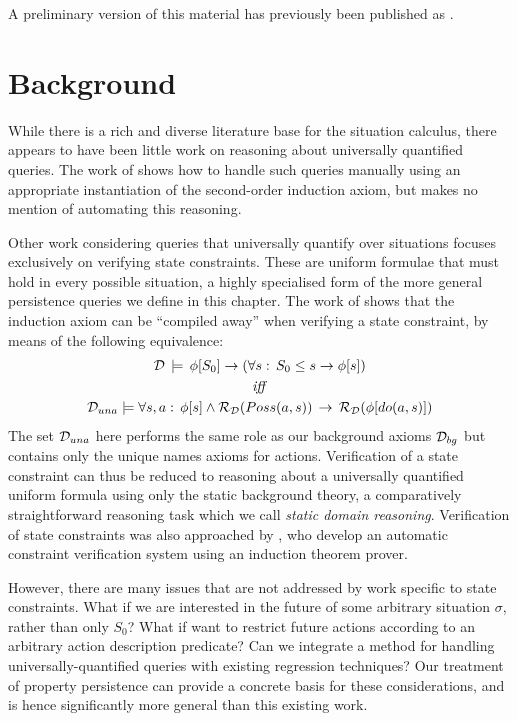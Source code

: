 A preliminary version of this material has previously been published
as \citep{kelly07sc_persistence}.


\section{Background\label{sec:Persistence:Background}}

While there is a rich and diverse literature base for the situation
calculus, there appears to have been little work on reasoning about
universally quantified queries. The work of \citet{Reiter93proving}
shows how to handle such queries manually using an appropriate instantiation
of the second-order induction axiom, but makes no mention of automating
this reasoning.

Other work considering queries that universally quantify over situations
focuses exclusively on verifying state constraints. These are uniform
formulae that must hold in every possible situation, a highly specialised
form of the more general persistence queries we define in this chapter.
The work of \citet{Lin94-StateConstraints} shows that the induction
axiom can be {}``compiled away'' when verifying a state constraint,
by means of the following equivalence:\begin{gather*}
\mathcal{D}\,\models\,\phi[S_{0}]\rightarrow\left(\forall s:\, S_{0}\leq s\rightarrow\phi[s]\right)\\
\mathit{iff}\\
\mathcal{D}_{una}\models\forall s,a:\,\phi[s]\wedge\mathcal{R}_{\mathcal{D}}(Poss(a,s))\,\rightarrow\,\mathcal{R}_{\mathcal{D}}(\phi[do(a,s)])\end{gather*}
 The set $\mathcal{D}_{una}$ here performs the same role as our background
axioms $\mathcal{D}_{bg}$ but contains only the unique names axioms for actions.
Verification of a state constraint can thus be reduced to reasoning
about a universally quantified uniform formula using only the static
background theory, a comparatively straightforward reasoning task
which we call \emph{static domain reasoning}. Verification of state
constraints was also approached by \citet{bertossi96automating},
who develop an automatic constraint verification system using an induction
theorem prover.

However, there are many issues that are not addressed by work specific
to state constraints. What if we are interested in the future of some
arbitrary situation $\sigma$, rather than only $S_{0}$? What if
want to restrict future actions according to an arbitrary action description
predicate? Can we integrate a method for handling universally-quantified
queries with existing regression techniques? Our treatment of property
persistence can provide a concrete basis for these considerations,
and is hence significantly more general than this existing work.

